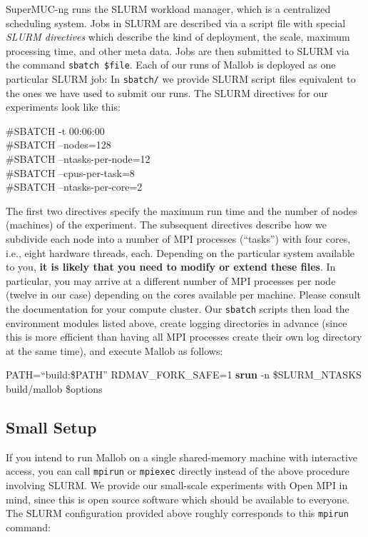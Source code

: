 \documentclass[runningheads]{article}
\numberwithin{dummy}{subsection}
\begin{document}
SuperMUC-ng runs the SLURM workload manager, which is a centralized scheduling system.
Jobs in SLURM are described via a script file with special \textit{SLURM directives} which describe the kind of deployment, the scale, maximum processing time, and other meta data.
Jobs are then submitted to SLURM via the command \texttt{sbatch \$file}.
Each of our runs of Mallob is deployed as one particular SLURM job: In \texttt{sbatch/} we provide SLURM script files equivalent to the ones we have used to submit our runs.
The SLURM directives for our experiments look like this:
\begin{ttfenv}
\#SBATCH -t 00:06:00\\
\#SBATCH --nodes=128\\
\#SBATCH --ntasks-per-node=12\\
\#SBATCH --cpus-per-task=8\\
\#SBATCH --ntasks-per-core=2
\end{ttfenv}
The first two directives specify the maximum run time and the number of nodes (machines) of the experiment.
The subsequent directives describe how we subdivide each node into a number of MPI processes (``tasks'') with four cores, i.e., eight hardware threads, each.
Depending on the particular system available to you, \textbf{it is likely that you need to modify or extend these files}.
In particular, you may arrive at a different number of MPI processes per node (twelve in our case) depending on the cores available per machine.
Please consult the documentation for your compute cluster.
Our \texttt{sbatch} scripts then load the environment modules listed above, create logging directories in advance (since this is more efficient than having all MPI processes create their own log directory at the same time), and execute Mallob as follows:
\begin{ttfenv}
PATH=``build:\$PATH'' RDMAV\_FORK\_SAFE=1 \textbf{srun} -n \$SLURM\_NTASKS build/mallob \$options
\end{ttfenv}


\subsection{Small Setup}
\label{sec:small-setup}

If you intend to run Mallob on a single shared-memory machine with interactive access, you can call \texttt{mpirun} or \texttt{mpiexec} directly instead of the above procedure involving SLURM.
We provide our small-scale experiments with Open MPI in mind, since this is open source software which should be available to everyone.
The SLURM configuration provided above roughly corresponds to this \texttt{mpirun} command:
\end{document}

